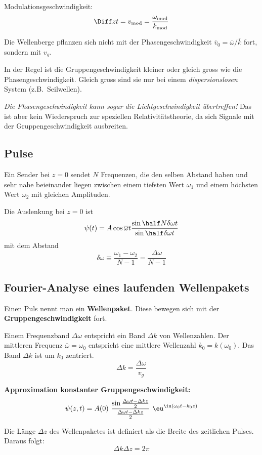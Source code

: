 		Modulationsgeschwindigkeit:
		\[
			\Diff z t = v_\text{mod} = \frac{\omega_\text{mod}}{k_\text{mod}}
		\]
		
		Die Wellenberge pflanzen sich nicht mit der Phasengeschwindigkeit $\overline v_0 = \overline \omega/\overline k$ fort, sondern mit $v_g$.
		
		In der Regel ist die Gruppengeschwindigkeit kleiner oder gleich gross wie die Phasengeschwindigkeit. Gleich gross sind sie nur bei einem \emph{dispersionslosen} System (z.B.~Seilwellen).
		
		\emph{Die Phasengeschwindigkeit kann sogar die Lichtgeschwindigkeit übertreffen!} Das ist aber kein Wiederspruch zur speziellen Relativitätstheorie, da sich Signale mit der Gruppengeschwindigkeit ausbreiten.
	\subsection{Pulse} %
		Ein Sender bei $z=0$ sendet $N$ Frequenzen, die den selben Abstand haben und sehr nahe beieinander liegen zwischen einem tiefsten Wert $\omega_1$ und einem höchsten Wert $\omega_2$ mit gleichen Amplituden.
		
		Die Auslenkung bei $z=0$ ist
		\[
			\psi(t) = A \cos \overline\omega t \frac{\sin \half N\delta \omega t}{\sin \half \delta \omega t}
		\]
		mit dem Abstand
		\[
			\delta \omega \equiv \frac{\omega_1 - \omega_2}{N-1} = \frac{\Delta \omega}{N-1}
		\]
	\subsection{Fourier-Analyse eines laufenden Wellenpakets} %
		Einen Puls nennt man ein \textbf{Wellenpaket}. Diese bewegen sich mit der \textbf{Gruppengeschwindigkeit} fort.
		
		Einem Frequenzband $\Delta \omega$ entspricht ein Band $\Delta k$ von Wellenzahlen. Der mittleren Frequenz $\overline \omega = \omega_0$ entspricht eine mittlere Wellenzahl $k_0 = k(\omega_0)$. Das Band $\Delta k$ ist um $k_0$ zentriert.
		\[
			\Delta k = \frac{\Delta \omega}{v_g}
		\]
		
		\textbf{Approximation konstanter Gruppengeschwindigkeit:}
		\[
			\psi(z,t) = A(0) \ \frac{\sin \frac{\Delta\omega t - \Delta k z}{2}}{\frac{\Delta\omega t - \Delta k z}{2}} \ \eu^{\iu (\omega_0 t - k_0 z)}
		\]
		
		Die Länge $\Delta z$ des Wellenpaketes ist definiert als die Breite des zeitlichen Pulses. Daraus folgt:
		\begin{equation}\label{eq:puls_breite}
			\Delta k \Delta z = 2\pi
		\end{equation}
		
